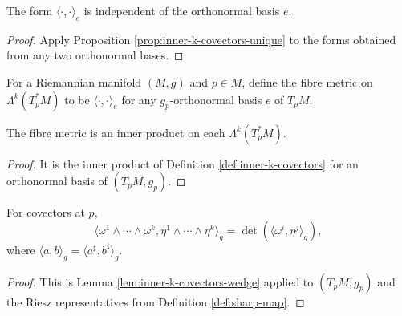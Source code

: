 \begin{proposition}
\label{prop:inner-k-covectors-frame-independent}
\leanok
{}
The form $\langle\cdot,\cdot\rangle_e$ is independent of the orthonormal basis $e$.
\end{proposition}
\begin{proof}
\leanok
{}
\sketch Apply Proposition \ref{prop:inner-k-covectors-unique} to the forms obtained from any two orthonormal bases.
\end{proof}

\begin{definition}
\label{def:fiber-metric-forms-pointwise}
\leanok
{}
For a Riemannian manifold $(M,g)$ and $p\in M$, define the fibre metric on $\Lambda^k(T_p^*M)$ to be $\langle\cdot,\cdot\rangle_e$ for any $g_p$-orthonormal basis $e$ of $T_pM$.
\end{definition}

\begin{lemma}
\label{lem:fiber-metric-forms-inner-product}
\leanok
{}
The fibre metric is an inner product on each $\Lambda^k(T_p^*M)$.
\end{lemma}
\begin{proof}
\leanok
{}
\sketch It is the inner product of Definition \ref{def:inner-k-covectors} for an orthonormal basis of $(T_pM,g_p)$.
\end{proof}

\begin{lemma}
\label{lem:fiber-metric-forms-wedge}
\leanok
{}
For covectors at $p$,
\[
\langle\omega^1\wedge\cdots\wedge\omega^k,\eta^1\wedge\cdots\wedge\eta^k\rangle_g=\det(\langle\omega^i,\eta^j\rangle_g),
\]
where $\langle a,b\rangle_g=\langle a^\sharp,b^\sharp\rangle_g$.
\end{lemma}
\begin{proof}
\leanok
{}
\sketch This is Lemma \ref{lem:inner-k-covectors-wedge} applied to $(T_pM,g_p)$ and the Riesz representatives from Definition \ref{def:sharp-map}.
\end{proof}

